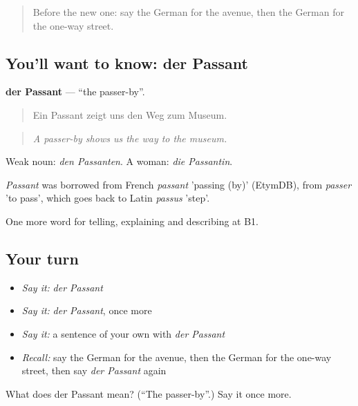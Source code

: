 \label{lesson:GE-C436-passant}



\begin{quote}
Before the new one: say the German for the avenue, then the German for the one-way street.
\end{quote}

\subsection*{You'll want to know: der Passant}
\textbf{der Passant} — \textquotedblleft{}the passer-by\textquotedblright{}.

\begin{quote}
Ein Passant zeigt uns den Weg zum Museum.
\end{quote}

\begin{quote}
\emph{A passer-by shows us the way to the museum.}
\end{quote}

Weak noun: \emph{den Passanten}. A woman: \emph{die Passantin}.

\begin{cousinweb}
\emph{Passant} was borrowed from French \emph{passant} 'passing (by)' (EtymDB), from \emph{passer} 'to pass', which goes back to Latin \emph{passus} 'step'.
\end{cousinweb}

\begin{grammarlens}[title={What you've built}]
One more word for telling, explaining and describing at B1.
\end{grammarlens}

\subsection*{Your turn}
\begin{itemize}
\raggedright
  \item \emph{Say it:} \emph{der Passant}
  \item \emph{Say it:} \emph{der Passant}, once more
  \item \emph{Say it:} a sentence of your own with \emph{der Passant}
  \item \emph{Recall:} say the German for the avenue, then the German for the one-way street, then say \emph{der Passant} again
\end{itemize}

\begin{tcolorbox}[breakable,colback=teal!4,colframe=teal!35!black,title={Before you move on}]
What does der Passant mean? (\textquotedblleft{}The passer-by\textquotedblright{}.) Say it once more.
\end{tcolorbox}
